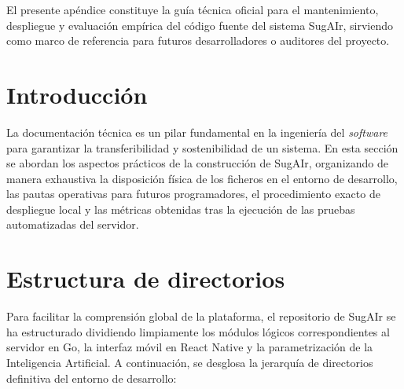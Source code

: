 
El presente apéndice constituye la guía técnica oficial para el mantenimiento, despliegue y evaluación empírica del código fuente del sistema SugAIr, sirviendo como marco de referencia para futuros desarrolladores o auditores del proyecto.

\section{Introducción}
La documentación técnica es un pilar fundamental en la ingeniería del \textit{software} para garantizar la transferibilidad y sostenibilidad de un sistema. En esta sección se abordan los aspectos prácticos de la construcción de SugAIr, organizando de manera exhaustiva la disposición física de los ficheros en el entorno de desarrollo, las pautas operativas para futuros programadores, el procedimiento exacto de despliegue local y las métricas obtenidas tras la ejecución de las pruebas automatizadas del servidor.

\section{Estructura de directorios}
Para facilitar la comprensión global de la plataforma, el repositorio de SugAIr se ha estructurado dividiendo limpiamente los módulos lógicos correspondientes al servidor en Go, la interfaz móvil en React Native y la parametrización de la Inteligencia Artificial. A continuación, se desglosa la jerarquía de directorios definitiva del entorno de desarrollo:


